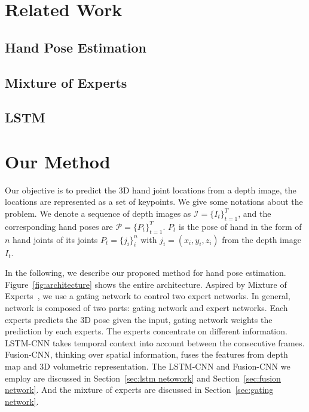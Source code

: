 \documentclass[journal,comsoc]{IEEEtran}
\begin{document}

\section{Related Work}\label{sec:related work}
\subsection{Hand Pose Estimation}
\subsection{Mixture of Experts}
\subsection{LSTM}


\section{Our Method}\label{sec:our method}
Our objective is to predict the 3D hand joint locations from a depth image, the locations are represented as a set of keypoints.
We give some notations about the problem. We denote a sequence of depth images as $\mathcal{I}=\{I_t\}_{t=1}^T$,
and the corresponding hand poses are $\mathcal{P}=\{P_t\}_{t=1}^T$. $P_t$ is the pose of hand in the form of $n$
hand joints of its joints $P_t=\{j_i\}_i^n$ with $j_i=(x_i,y_i,z_i)$ from the depth image $I_t$.

In the following, we describe our proposed method for hand pose estimation. Figure~\ref{fig:architecture} shows the entire
architecture. Aspired by Mixture of Experts~\cite{jacobs1991adaptive}, we use a gating network to
control two expert networks. In general, network is composed of two parts: gating network and expert networks.
Each experts predicts the 3D pose given the input, gating network weights the prediction by each experts.
The experts concentrate on different information. LSTM-CNN takes temporal context into account between the consecutive frames.
Fusion-CNN, thinking over spatial information, fuses the features from depth map and 3D volumetric representation.
The LSTM-CNN and Fusion-CNN we employ are discussed in Section~\ref{sec:lstm netowork} and Section~\ref{sec:fusion network}.
And the mixture of experts are discussed in Section~\ref{sec:gating network}.
\end{document}
